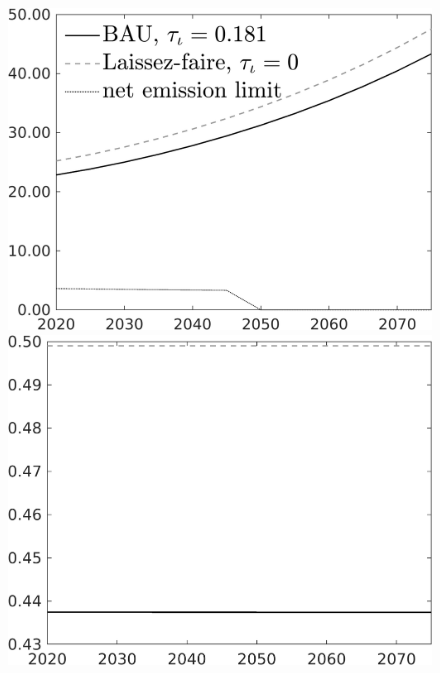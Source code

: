 \documentclass[12pt]{article}
\begin{document}
\begin{figure}[h!!]
\begin{minipage}[]{0.32\textwidth}
	\end{minipage}	
	\begin{minipage}[]{0.32\textwidth}
		\includegraphics[width=1\textwidth]{../../codding_model/own_basedOnFried/optimalPol_010922_revision/figures/all_13Sept22/CompTaul_LFBAU_Reg0_Emnet_spillover0_nsk0_xgr1_knspil0_sep1_countec0_GovRev0_etaa0.79_lgd1.png}
	\end{minipage}	
	\begin{minipage}[]{0.32\textwidth}
		\includegraphics[width=1\textwidth]{../../codding_model/own_basedOnFried/optimalPol_010922_revision/figures/all_13Sept22/CompTaul_LFBAU_Reg0_hh_spillover0_nsk0_xgr1_knspil0_sep1_countec0_GovRev0_etaa0.79_lgd0.png}

\end{minipage}
\end{figure}
\end{document}
